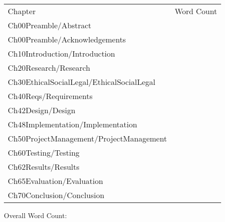 \documentclass[]{article}
\numberwithin{equation}{section} %
\begin{document}
\newcommand{\chapterwordcount}[1]{#1 & \quickwordcount{#1} \\}

\begin{tabular}{lc}
    Chapter & Word Count \\
    \chapterwordcount{Ch00Preamble/Abstract}
    \chapterwordcount{Ch00Preamble/Acknowledgements}
    \chapterwordcount{Ch10Introduction/Introduction}
    \chapterwordcount{Ch20Research/Research}
    \chapterwordcount{Ch30EthicalSocialLegal/EthicalSocialLegal}
    \chapterwordcount{Ch40Reqs/Requirements}
    \chapterwordcount{Ch42Design/Design}
    \chapterwordcount{Ch48Implementation/Implementation}
    \chapterwordcount{Ch50ProjectManagement/ProjectManagement}
    \chapterwordcount{Ch60Testing/Testing}
    \chapterwordcount{Ch62Results/Results}
    \chapterwordcount{Ch65Evaluation/Evaluation}
    \chapterwordcount{Ch70Conclusion/Conclusion}
\end{tabular}

Overall Word Count: 
\end{document}
